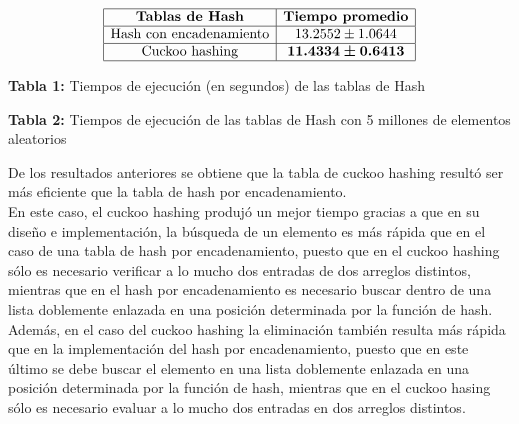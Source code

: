 \documentclass[titlepage]{article}
\begin{document}
	$$\begin{array}{|c|c|}
		\hline
		\textbf{Tablas de Hash} & \textbf{Tiempo promedio}\\
		\hline
		\text{Hash con encadenamiento} & 13.2552\pm 1.0644 \\
		\hline
		\text{Cuckoo hashing} & \boldsymbol{11.4334\pm 0.6413}\\
		\hline
	\end{array}$$\:
	\begin{center}
		\textbf{Tabla 1:} Tiempos de ejecuci\'on (en segundos) de las tablas de Hash
	\end{center}\:
        \begin{center}
        \end{center}\:
        \begin{center}
		\textbf{Tabla 2:} Tiempos de ejecuci\'on de las tablas de Hash con 5 millones de elementos aleatorios
	\end{center}\:
	De los resultados anteriores se obtiene que la tabla de cuckoo hashing result\'o ser m\'as eficiente que la tabla de hash por encadenamiento.\\
	
	En este caso, el cuckoo hashing produj\'o un mejor tiempo gracias a que en su diseño e implementaci\'on, la b\'usqueda de un elemento es m\'as r\'apida que en el caso de una tabla de hash por encadenamiento, puesto que en el cuckoo hashing s\'olo es necesario verificar a lo mucho dos entradas de dos arreglos distintos, mientras que en el hash por encadenamiento es necesario buscar dentro de una lista doblemente enlazada en una posici\'on determinada por la funci\'on de hash.\\
	
	Adem\'as, en el caso del cuckoo hashing la eliminaci\'on tambi\'en resulta m\'as r\'apida que en la implementaci\'on del hash por encadenamiento, puesto que en este \'ultimo se debe buscar el elemento en una lista doblemente enlazada en una posici\'on determinada por la funci\'on de hash, mientras que en el cuckoo hasing s\'olo es necesario evaluar a lo mucho dos entradas en dos arreglos distintos.\\
	
\end{document}
